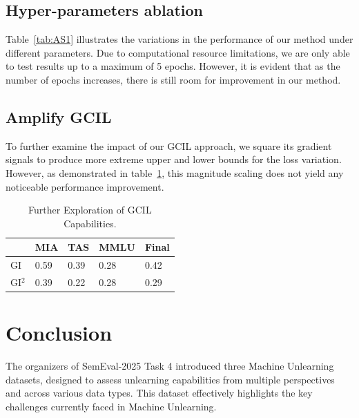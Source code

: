 \documentclass[11pt]{article}
\begin{document}
\subsection{Hyper-parameters ablation}  

Table~\ref{tab:AS1} illustrates the variations in the performance of our method under different parameters. Due to computational resource limitations, we are only able to test results up to a maximum of 5 epochs. However, it is evident that as the number of epochs increases, there is still room for improvement in our method.

\subsection{Amplify GCIL} 
To further examine the impact of our GCIL approach, we square its gradient signals to produce more extreme upper and lower bounds for the loss variation. However, as demonstrated in table~\ref{tab:accents}, this magnitude scaling does not yield any noticeable performance improvement.

\begin{table}[h]\footnotesize
  \centering
    \begin{tabular}{l|l|l|l|l}
    \hline
        ~ & MIA & TAS & MMLU & Final \\ \hline
        GI & 0.59 & 0.39 & 0.28 & 0.42 \\ \hline
        GI$^2$ & 0.39 & 0.22 & 0.28 & 0.29 \\ \hline
    \end{tabular}
  \caption{Further Exploration of GCIL Capabilities.}
  \label{tab:accents}
\end{table}





\section{Conclusion} 
The organizers of SemEval-2025 Task 4 introduced three Machine Unlearning datasets, designed to assess unlearning capabilities from multiple perspectives and across various data types. This dataset effectively highlights the key challenges currently faced in Machine Unlearning.
\end{document}
